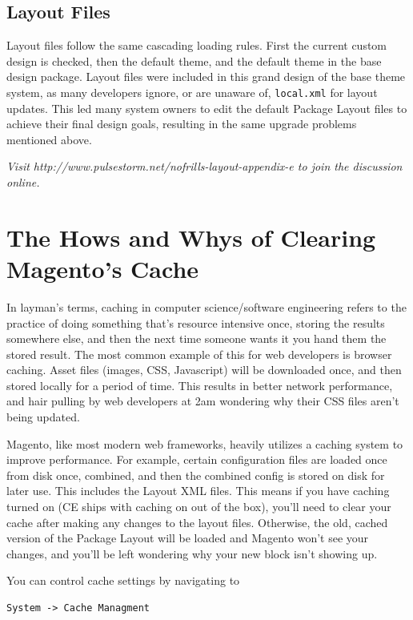 \documentclass[oneside]{book}
\begin{document}
\section{Layout Files}

Layout files follow the same cascading loading rules.  First the current custom design is checked, then the default theme, and the default theme in the base design package.  Layout files were included in this grand design of the base theme system, as many developers ignore, or are unaware of,  \footnotesize\texttt{local.xml} \normalsize  for layout updates. This led many system owners to edit the default Package Layout files to achieve their final design goals, resulting in the same upgrade problems mentioned above.

\emph{Visit http://www.pulsestorm.net/nofrills-layout-appendix-e to join the discussion online.}
\chapter{The Hows and Whys of Clearing Magento's Cache}
In layman's terms, caching in computer science/software engineering refers to the practice of doing something that's resource intensive once, storing the results somewhere else, and then the next time someone wants it you hand them the stored result.  The most common example of this for web developers is browser caching.  Asset files (images, CSS, Javascript) will be downloaded once, and then stored locally for a period of time.  This results in better network performance, and hair pulling by web developers at 2am wondering why their CSS files aren't being updated.

Magento, like most modern web frameworks, heavily utilizes a caching system to improve performance.  For example, certain configuration files are loaded once from disk once, combined, and then the combined config is stored on disk for later use.  This includes the Layout XML files.  This means if you have caching turned on (CE ships with caching on out of the box), you'll need to clear your cache after making any changes to the layout files.  Otherwise, the old, cached version of the Package Layout will be loaded and Magento won't see your changes, and you'll be left wondering why your new block isn't showing up.

You can control cache settings by navigating to

\begin{lstlisting}
System -> Cache Managment

\end{lstlisting}
\end{document}
